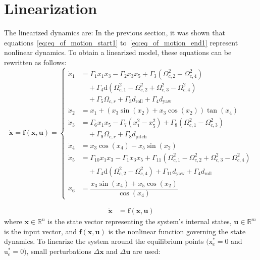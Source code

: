\documentclass[3p]{elsarticle}
\begin{document}
\section{Linearization}
\label{sec:linearization}
The linearized dynamics are:
In the previous section, it was shown that equations~\eqref{eq:eq_of_motion_start1} to~\eqref{eq:eq_of_motion_end1} represent nonlinear dynamics. To obtain a linearized model, these equations can be rewritten as follows:
\begin{equation}
    \dot{\mathbf{x}} = \mathbf{f}(\mathbf{x}, \mathbf{u}) = \begin{cases}
        \dot{x}_1 &= \Gamma_1 x_1 x_3 - \Gamma_2 x_3 x_5 + \Gamma_3 (\Omega_{c, 2}^2 - \Omega_{c, 4}^2)  \\
        &\quad + \Gamma_4 \mathrm{d} (\Omega_{c, 1}^2 - \Omega_{c, 2}^2 + \Omega_{c, 3}^2 - \Omega_{c, 4}^2)  \\
        &\quad + \Gamma_5 \Omega_{c, r} + \Gamma_3 d_{\text{roll}} + \Gamma_4 d_{\text{yaw}}  \\
        \dot{x}_2 &= x_1 + (x_3\sin(x_2) + x_3\cos(x_2))\tan(x_4)  \\
        \dot{x}_3 &= \Gamma_6 x_1 x_5 - \Gamma_7 (x_1^2 - x_5^2) + \Gamma_8 (\Omega_{c, 1}^2 - \Omega_{c, 3}^2)  \\
        &\quad + \Gamma_9 \Omega_{c, r} + \Gamma_8 d_{\text{pitch}} \\
        \dot{x}_4 &= x_3\cos(x_4) - x_5\sin(x_2) \\
        \dot{x}_5 &= \Gamma_{10} x_1 x_3 - \Gamma_{1} x_3 x_5 + \Gamma_{11} (\Omega_{c, 1}^2 - \Omega_{c, 2}^2 + \Omega_{c, 3}^2 - \Omega_{c, 4}^2)  \\
        &\quad + \Gamma_{4} \mathrm{d} (\Omega_{c, 2}^2 - \Omega_{c, 4}^2) + \Gamma_{11} d_{\text{yaw}} + \Gamma_{4} d_{\text{roll}} \\
        \dot{x}_6 &= \dfrac{x_3\sin(x_4) + x_5\cos(x_2)}{\cos(x_4)}
    \end{cases}
\end{equation}
    

\begin{align}
\dot{\mathbf{x}} &= \mathbf{f}(\mathbf{x}, \mathbf{u})
\end{align}
where $\mathbf{x} \in \mathbb{R}^n$ is the state vector representing the system's internal states,
$\mathbf{u} \in \mathbb{R}^m$ is the input vector, and
$\mathbf{f}(\mathbf{x}, \mathbf{u})$ is the nonlinear function governing the state dynamics.
To linearize the system around the equilibrium points $(\boldsymbol{{\mathrm{x}}}_e^*\!=\!0$ and $\boldsymbol{{\mathrm{u}}}_e^*\!=\!0)$, small perturbations $\Delta \mathbf{x}$ and $\Delta \mathbf{u}$ are used:
\end{document}
